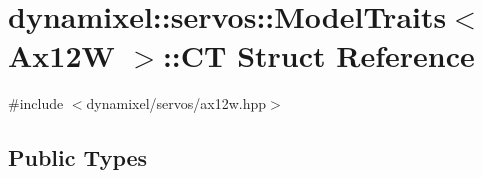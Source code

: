 \hypertarget{structdynamixel_1_1servos_1_1_model_traits_3_01_ax12_w_01_4_1_1_c_t}{}\section{dynamixel\+:\+:servos\+:\+:Model\+Traits$<$ Ax12W $>$\+:\+:CT Struct Reference}
\label{structdynamixel_1_1servos_1_1_model_traits_3_01_ax12_w_01_4_1_1_c_t}


{\ttfamily \#include $<$dynamixel/servos/ax12w.\+hpp$>$}

\subsection*{Public Types}
